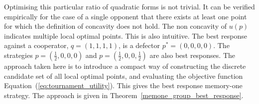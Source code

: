 \documentclass[fleqn,10pt]{wlscirep}
\begin{document}
Optimising this particular ratio of quadratic forms is not trivial. It can be
verified empirically for the case of a single opponent that there exists at
least one point for which the definition of concavity does not hold.
The non concavity of \(u(p)\) indicates multiple local
optimal points. This is also intuitive. The best response against a cooperator,
\(q=(1, 1, 1, 1)\), is a defector \(p^*=(0, 0, 0, 0)\). The strategies
\(p=(\frac{1}{2}, 0, 0, 0)\) and \(p=(\frac{1}{2}, 0, 0, \frac{1}{2})\) are also
best responses. The approach taken here is to introduce a compact way of
constructing the discrete candidate set of all local optimal points, and evaluating
the objective function Equation~(\ref{eq:tournament_utility}). This gives the best
response memory-one strategy. The approach is given in
Theorem~\ref{memone_group_best_response}.
\end{document}
